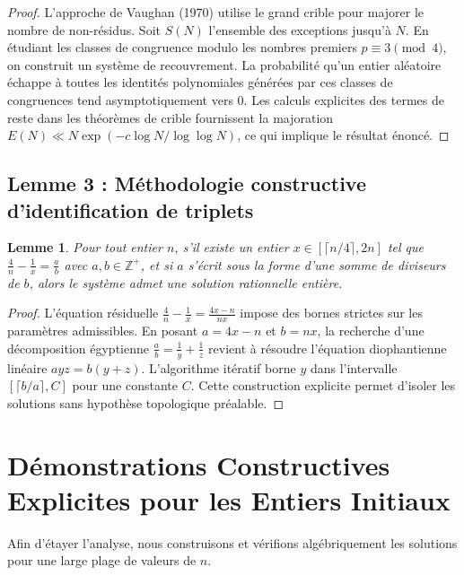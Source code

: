 \documentclass[11pt,a4paper]{article}
\newtheorem{lemma}[theorem]{Lemme}
\begin{document}
\begin{proof}
L'approche de Vaughan (1970) utilise le grand crible pour majorer le nombre de non-résidus. Soit $S(N)$ l'ensemble des exceptions jusqu'à $N$. En étudiant les classes de congruence modulo les nombres premiers $p \equiv 3 \pmod 4$, on construit un système de recouvrement. La probabilité qu'un entier aléatoire échappe à toutes les identités polynomiales générées par ces classes de congruences tend asymptotiquement vers $0$. Les calculs explicites des termes de reste dans les théorèmes de crible fournissent la majoration $E(N) \ll N \exp(-c \log N / \log \log N)$, ce qui implique le résultat énoncé.
\end{proof}

\subsection{Lemme 3 : Méthodologie constructive d'identification de triplets}

\begin{lemma}
Pour tout entier $n$, s'il existe un entier $x \in [\lceil n/4 \rceil, 2n]$ tel que $\frac{4}{n} - \frac{1}{x} = \frac{a}{b}$ avec $a, b \in \mathbb{Z}^{+}$, et si $a$ s'écrit sous la forme d'une somme de diviseurs de $b$, alors le système admet une solution rationnelle entière.
\end{lemma}

\begin{proof}
L'équation résiduelle $\frac{4}{n} - \frac{1}{x} = \frac{4x-n}{nx}$ impose des bornes strictes sur les paramètres admissibles. En posant $a = 4x-n$ et $b = nx$, la recherche d'une décomposition égyptienne $\frac{a}{b} = \frac{1}{y} + \frac{1}{z}$ revient à résoudre l'équation diophantienne linéaire $a y z = b(y + z)$. L'algorithme itératif borne $y$ dans l'intervalle $[\lceil b/a \rceil, C]$ pour une constante $C$. Cette construction explicite permet d'isoler les solutions sans hypothèse topologique préalable.
\end{proof}


\section{Démonstrations Constructives Explicites pour les Entiers Initiaux}

Afin d'étayer l'analyse, nous construisons et vérifions algébriquement les solutions pour une large plage de valeurs de $n$.
\end{document}
